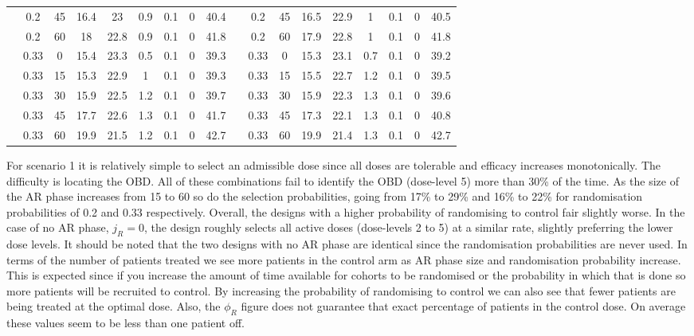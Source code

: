 \begin{table}
{\begin{tabular}[t]{cccccccc>{}c|ccccccccc}
			& 0.2 & 45 & 16.4 & 23 & 0.9 & 0.1 & 0 & 40.4 &  & 0.2 & 45 & 16.5 & 22.9 & 1 & 0.1 & 0 & 40.5\\
			
			& 0.2 & 60 & 18 & 22.8 & 0.9 & 0.1 & 0 & 41.8 &  & 0.2 & 60 & 17.9 & 22.8 & 1 & 0.1 & 0 & 41.8\\
			
			& 0.33 & 0 & 15.4 & 23.3 & 0.5 & 0.1 & 0 & 39.3 &  & 0.33 & 0 & 15.3 & 23.1 & 0.7 & 0.1 & 0 & 39.2\\
			
			& 0.33 & 15 & 15.3 & 22.9 & 1 & 0.1 & 0 & 39.3 &  & 0.33 & 15 & 15.5 & 22.7 & 1.2 & 0.1 & 0 & 39.5\\
			
			& 0.33 & 30 & 15.9 & 22.5 & 1.2 & 0.1 & 0 & 39.7 &  & 0.33 & 30 & 15.9 & 22.3 & 1.3 & 0.1 & 0 & 39.6\\
			
			& 0.33 & 45 & 17.7 & 22.6 & 1.3 & 0.1 & 0 & 41.7 &  & 0.33 & 45 & 17.3 & 22.1 & 1.3 & 0.1 & 0 & 40.8\\
			
			\multirow{-10}{*}{\centering\arraybackslash 6} & 0.33 & 60 & 19.9 & 21.5 & 1.2 & 0.1 & 0 & 42.7 & \multirow{-10}{*}{\centering\arraybackslash 12} & 0.33 & 60 & 19.9 & 21.4 & 1.3 & 0.1 & 0 & 42.7\\
			\bottomrule
	\end{tabular}}
\end{table}

For scenario 1 it is relatively simple to select an admissible dose since all doses are tolerable and efficacy increases monotonically. The difficulty is locating the OBD. All of these combinations fail to identify the OBD (dose-level 5) more than 30\% of the time. As the size of the AR phase increases from 15 to 60 so do the selection probabilities, going from 17\% to 29\% and 16\% to 22\% for randomisation probabilities of 0.2 and 0.33 respectively. Overall, the designs with a higher probability of randomising to control fair slightly worse. In the case of no AR phase, $j_R =0$, the design roughly selects all active doses (dose-levels 2 to 5) at a similar rate, slightly preferring the lower dose levels. It should be noted that the two designs with no AR phase are identical since the randomisation probabilities are never used. In terms of the number of patients treated we see more patients in the control arm as AR phase size and randomisation probability increase. This is expected since if you increase the amount of time available for cohorts to be randomised or the probability in which that is done so more patients will be recruited to control. By increasing the probability of randomising to control we can also see that fewer patients are being treated at the optimal dose. Also, the $\phi_R$ figure does not guarantee that exact percentage of patients in the control dose. On average these values seem to be less than one patient off. 

